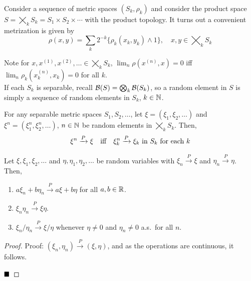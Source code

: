 Consider a sequence of metric spaces $(S_k, \rho_k)$ and consider the product space $S = \bigtimes_{k} S_k = S_1 \times S_2 \times \cdots$ with the product topology. It turns out a convenient metrization is given by
\[ \rho(x, y) = \sum_{k} 2^{-k}\{\rho_k(x_k, y_k) \wedge 1\}, \quad x, y \in \bigtimes_{k} S_k \]

Note for $x, x^{(1)}, x^{(2)}, \ldots \in \bigtimes_{k} S_k$, $\lim_{n} \rho(x^{(n)}, x) = 0$ iff $\lim_{n} \rho_k(x_k^{(n)}, x_k) = 0$ for all $k$.\\

If each $S_k$ is separable, recall $\cal{B}(S) = \bigotimes_{k} \cal{B}(S_k)$, so a random element in $S$ is simply a sequence of random elements in $S_k$, $k \in \N$.

\begin{lemma}
    For any separable metric spaces $S_1, S_2, \ldots$, let $\xi = (\xi_1, \xi_2, \ldots)$ and $\xi^{n} = (\xi_1^{n}, \xi_2^{n}, \ldots)$, $n \in \N$ be random elements in $\bigtimes_{k} S_k$. Then,
    \[ \xi^{n} \xrightarrow{P} \xi \quad \tt{iff} \quad \xi_k^{n} \xrightarrow{P} \xi_k \tt{ in } S_k \tt{ for each } k \]
\end{lemma}

\begin{lemma}
    Let $\xi, \xi_1, \xi_2, \ldots$ and $\eta, \eta_1, \eta_2, \ldots$ be random variables with $\xi_n \xrightarrow{P} \xi$ and $\eta_n \xrightarrow{P} \eta$. Then,
    \begin{enumerate}[label = (\roman*)]
        \item $a\xi_n + b\eta_n \xrightarrow{P} a\xi + b\eta$ for all $a, b \in \R$.
        \item $\xi_n\eta_n \xrightarrow{P} \xi\eta$.
        \item $\xi_n/\eta_n \xrightarrow{P} \xi/\eta$ whenever $\eta \neq 0$ and $\eta_n \neq 0$ a.s.\ for all $n$.
    \end{enumerate}
\end{lemma}
\begin{proof}{Proof:}
    $(\xi_n, \eta_n) \xrightarrow{P} (\xi, \eta)$, and as the operations are continuous, it follows.

    $\qed$
\end{proof}
